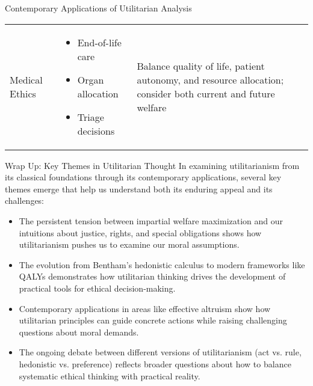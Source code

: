 \documentclass[aspectratio=169]{beamer}
\begin{document}
\begin{frame}{Contemporary Applications of Utilitarian Analysis}
\begin{table}[]
\begin{tabular}{p{2.2cm}p{3.5cm}p{3.5cm}}
            Medical Ethics & \begin{itemize}\setlength\itemsep{0em}
                \item End-of-life care
                \item Organ allocation
                \item Triage decisions
            \end{itemize} & 
            Balance quality of life, patient autonomy, and resource allocation; consider both current and future welfare
        \end{tabular}
    \end{table}
\end{frame}



\begin{frame}{Wrap Up: Key Themes in Utilitarian Thought}
    In examining utilitarianism from its classical foundations through its contemporary applications, several key themes emerge that help us understand both its enduring appeal and its challenges:
    
    \begin{itemize}
        \item The persistent tension between impartial welfare maximization and our intuitions about justice, rights, and special obligations shows how utilitarianism pushes us to examine our moral assumptions.
        
        \item The evolution from Bentham's hedonistic calculus to modern frameworks like QALYs demonstrates how utilitarian thinking drives the development of practical tools for ethical decision-making.
        
        \item Contemporary applications in areas like effective altruism show how utilitarian principles can guide concrete actions while raising challenging questions about moral demands.
        
        \item The ongoing debate between different versions of utilitarianism (act vs. rule, hedonistic vs. preference) reflects broader questions about how to balance systematic ethical thinking with practical reality.
    \end{itemize}
\end{frame}
\end{document}
